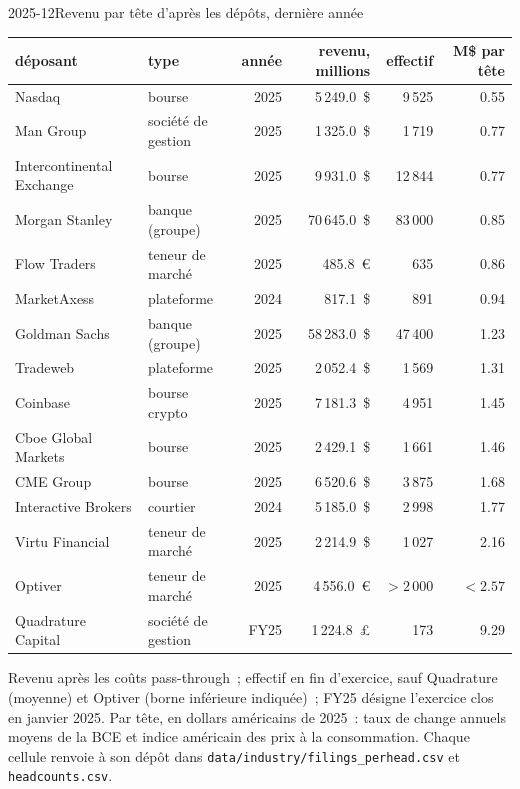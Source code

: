 \begin{dated}{2025-12}{Revenu par tête d'après les dépôts, dernière année}\label{dat:in:revenue-and-profit-across-the-industry:table}
\footnotesize
\begin{tabular}{@{}llrrrr@{}}
\toprule
déposant & type & année & revenu, millions & effectif & M\$ par tête\\
\midrule
Nasdaq & bourse & 2025 & 5\,249.0~\$ & 9\,525 & 0.55\\
Man Group & société de gestion & 2025 & 1\,325.0~\$ & 1\,719 & 0.77\\
Intercontinental Exchange & bourse & 2025 & 9\,931.0~\$ & 12\,844 & 0.77\\
Morgan Stanley & banque (groupe) & 2025 & 70\,645.0~\$ & 83\,000 & 0.85\\
Flow Traders & teneur de marché & 2025 & 485.8~\euro & 635 & 0.86\\
MarketAxess & plateforme & 2024 & 817.1~\$ & 891 & 0.94\\
Goldman Sachs & banque (groupe) & 2025 & 58\,283.0~\$ & 47\,400 & 1.23\\
Tradeweb & plateforme & 2025 & 2\,052.4~\$ & 1\,569 & 1.31\\
Coinbase & bourse crypto & 2025 & 7\,181.3~\$ & 4\,951 & 1.45\\
Cboe Global Markets & bourse & 2025 & 2\,429.1~\$ & 1\,661 & 1.46\\
CME Group & bourse & 2025 & 6\,520.6~\$ & 3\,875 & 1.68\\
Interactive Brokers & courtier & 2024 & 5\,185.0~\$ & 2\,998 & 1.77\\
Virtu Financial & teneur de marché & 2025 & 2\,214.9~\$ & 1\,027 & 2.16\\
Optiver & teneur de marché & 2025 & 4\,556.0~\euro & $>2\,000$ & $<2.57$\\
Quadrature Capital & société de gestion & FY25 & 1\,224.8~\pounds & 173 & 9.29\\
\bottomrule
\end{tabular}

\smallskip\noindent Revenu après les coûts pass-through~; effectif en fin d'exercice, sauf Quadrature (moyenne) et
Optiver (borne inférieure indiquée)~; FY25 désigne l'exercice clos en janvier 2025. Par tête, en dollars américains de 2025~: taux de change annuels moyens de la BCE et indice américain des prix à la consommation.
Chaque cellule renvoie à son dépôt dans \texttt{data/industry/filings\_perhead.csv} et \texttt{headcounts.csv}.
\end{dated}

